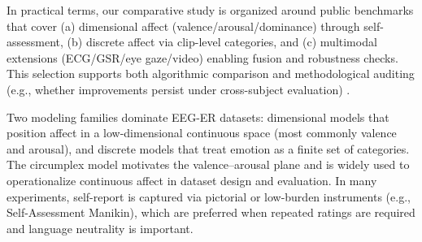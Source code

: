\documentclass{WileyMSP-template}
\begin{document}
In practical terms, our comparative study is organized around public benchmarks that cover (a) dimensional affect (valence/arousal/dominance) through self-assessment, (b) discrete affect via clip-level categories, and (c) multimodal extensions (ECG/GSR/eye gaze/video) enabling fusion and robustness checks. This selection supports both algorithmic comparison and methodological auditing (e.g., whether improvements persist under cross-subject evaluation) \cite{li2022tutorial,kukhilava2025evaluation}.

Two modeling families dominate EEG-ER datasets: dimensional models that position affect in a low-dimensional continuous space (most commonly valence and arousal), and discrete models that treat emotion as a finite set of categories. The circumplex model motivates the valence--arousal plane and is widely used to operationalize continuous affect in dataset design and evaluation. \cite{russell1980circumplex}
In many experiments, self-report is captured via pictorial or low-burden instruments (e.g., Self-Assessment Manikin), which are preferred when repeated ratings are required and language neutrality is important. \cite{bradley1994sam}
\end{document}
